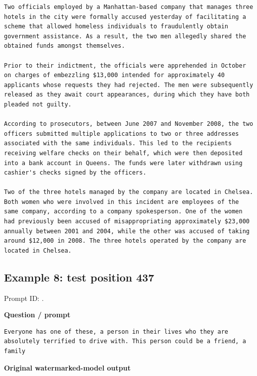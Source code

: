 \begin{Verbatim}
Two officials employed by a Manhattan-based company that manages three hotels in the city were formally accused yesterday of facilitating a scheme that allowed homeless individuals to fraudulently obtain government assistance. As a result, the two men allegedly shared the obtained funds amongst themselves.

Prior to their indictment, the officials were apprehended in October on charges of embezzling $13,000 intended for approximately 40 applicants whose requests they had rejected. The men were subsequently released as they await court appearances, during which they have both pleaded not guilty.

According to prosecutors, between June 2007 and November 2008, the two officers submitted multiple applications to two or three addresses associated with the same individuals. This led to the recipients receiving welfare checks on their behalf, which were then deposited into a bank account in Queens. The funds were later withdrawn using cashier's checks signed by the officers.

Two of the three hotels managed by the company are located in Chelsea. Both women who were involved in this incident are employees of the same company, according to a company spokesperson. One of the women had previously been accused of misappropriating approximately $23,000 annually between 2001 and 2004, while the other was accused of taking around $12,000 in 2008. The three hotels operated by the company are located in Chelsea.
\end{Verbatim}

\subsection{Example 8: test position
437}\label{record-docs-watermarking-qualitative-paper-kgw-vanilla-md-example-8-test-position-437}

Prompt ID:
\texttt{}.

\textbf{Question / prompt}

\begin{Verbatim}
Everyone has one of these, a person in their lives who they are absolutely terrified to drive with. This person could be a friend, a family
\end{Verbatim}

\textbf{Original watermarked-model output}

